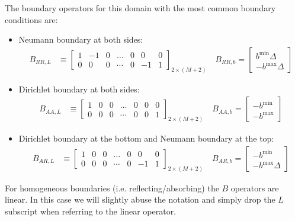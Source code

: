 \documentclass[11pt]{article}
\begin{document}
The boundary operators for this domain with the most common boundary conditions are:
\begin{itemize}
	\item Neumann boundary at both sides:
	\begin{align}
		B_{RR,L} &\equiv \begin{bmatrix}
		1&-1&0&\dots&0&0&0\\
		0&0&0&\cdots&0&-1&1
		\end{bmatrix}_{2\times (M+2)}\quad
		B_{RR,b} = \begin{bmatrix}b^{\min}\Delta\\-b^{\max}\Delta\end{bmatrix}\label{eq:B-RR}
	\end{align}

	\item Dirichlet boundary at both sides:
	\begin{align}
		B_{AA,L} &\equiv \begin{bmatrix}
		1&0&0&\dots&0&0&0\\
		0&0&0&\cdots&0&0&1
		\end{bmatrix}_{2\times (M+2)}\quad
		B_{AA,b} = \begin{bmatrix}-b^{\min}\\-b^{\max}\end{bmatrix}\label{eq:B-AA}
	\end{align}

	\item Dirichlet boundary at the bottom and Neumann boundary at the top:
	\begin{align}
		B_{AR,L} &\equiv \begin{bmatrix}
		1&0&0&\dots&0&0&0\\
		0&0&0&\cdots&0&-1&1
		\end{bmatrix}_{2\times (M+2)}\quad
		B_{AR,b} = \begin{bmatrix}-b^{\min}\\-b^{\max}\Delta\end{bmatrix}\label{eq:B-AR}
	\end{align}
\end{itemize}
For homogeneous boundaries (i.e. reflecting/absorbing) the $B$ operators are linear. In this case we will slightly abuse the notation and simply drop the $L$ subscript when referring to the linear operator.
\end{document}
